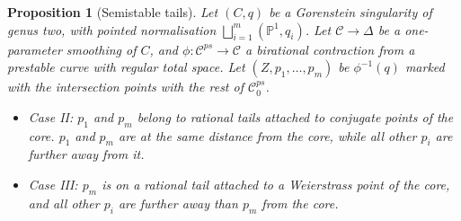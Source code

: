 \documentclass[11pt]{amsart}
\newcommand{\PP}{\mathbb P}
\renewcommand{\to}{\rightarrow}
\newcommand{\dvr}{\Delta}
\theoremstyle{plain}
\newtheorem{prop}[thm]{Proposition}
\theoremstyle{definition}
\begin{document}
\begin{prop}[Semistable tails]\label{prop:semistable tails} Let $(C,q)$ be a Gorenstein singularity of genus two, with pointed normalisation $\bigsqcup_{i=1}^m(\PP^1,q_i)$. Let $\mathcal C\to\dvr$ be a one-parameter smoothing of $C$, and $\phi\colon\mathcal C^{ps}\to\mathcal C$ a birational contraction from a prestable curve with regular total space. Let $(Z,p_1,\ldots,p_m)$ be $\phi^{-1}(q)$ marked with the intersection points with the rest of $\mathcal C^{ps}_0$.
 \begin{itemize}[leftmargin=.5cm]
  \item Case II: $p_1$ and $p_m$ belong to rational tails attached to conjugate points of the core. $p_1$ and $p_m$ are at the same distance from the core, while all other $p_i$ are further away from it.
  \item Case III: $p_m$ is on a rational tail attached to a Weierstrass point of the core, and all other $p_i$ are further away than $p_m$ from the core.
 \end{itemize}
\end{prop}
\end{document}
